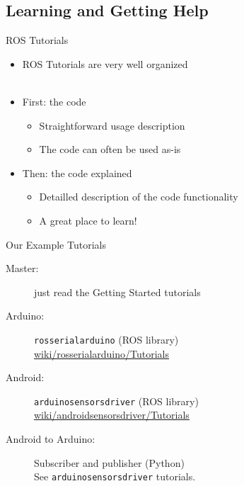 %
\subsection{Learning and Getting Help}

  \begin{frame}{ROS Tutorials}
    \begin{itemize}
      \item ROS Tutorials are very well organized\\~\\
      \item First: \alert{the code}
        \begin{itemize}
          \item Straightforward usage description
          \item The code can often be used \alert{as-is}
        \end{itemize}
      \item Then: \alert{the code explained}
        \begin{itemize}
          \item Detailled description of the code functionality
          \item A great place to learn!
        \end{itemize}
    \end{itemize}
  \end{frame}

  \begin{frame}{Our Example Tutorials}
    \begin{description}
      \item[Master:] just read the Getting Started tutorials
      \item[Arduino:] \alert{\texttt{rosserial\textunderscore arduino}} (ROS library)\\
                           \href{http://www.ros.org/wiki/rosserial\textunderscore arduino/Tutorials}{wiki/rosserial\textunderscore arduino/Tutorials}\\
      \item[Android:] \alert{\texttt{arduino\textunderscore sensors\textunderscore driver}} (ROS library)\\
                           \href{http://www.ros.org/wiki/android\textunderscore sensors\textunderscore driver/Tutorials}{wiki/android\textunderscore sensors\textunderscore driver/Tutorials}\\
      \item[Android to Arduino:] Subscriber and publisher (Python)\\
                                 See \texttt{arduino\textunderscore sensors\textunderscore driver} tutorials.
    \end{description}
  \end{frame}

